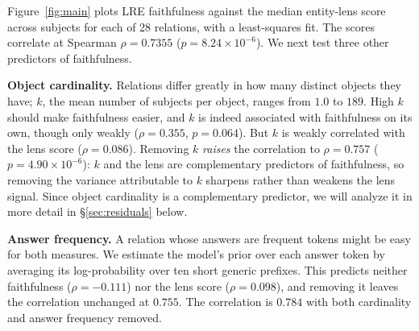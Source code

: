 \documentclass{article}
\def\headlinenumber{0.7355}
\begin{document}
Figure~\ref{fig:main} plots LRE faithfulness against the median entity-lens
score across subjects for each of 28 relations, with a least-squares fit.
The scores correlate at Spearman $\rho = \headlinenumber$
($p = 8.24\!\times\!10^{-6}$).
We next test three other predictors of faithfulness.




\textbf{Object cardinality.} Relations
differ greatly in how many distinct objects they have; $k$, the mean number
of subjects per object, ranges from $1.0$ to $189$. High $k$ should make
faithfulness easier, and $k$ is indeed associated with faithfulness on
its own, though only weakly
($\rho = 0.355$, $p = 0.064$). But $k$ is weakly correlated with the
lens score ($\rho = 0.086$). Removing $k$  \emph{raises} the
correlation to $\rho = 0.757$ ($p = 4.90\!\times\!10^{-6}$): $k$ and the lens are
complementary predictors of faithfulness, so removing the variance
attributable to $k$ sharpens rather than weakens the lens
signal. Since object cardinality is a complementary
predictor, we will analyze it in more detail in \S\ref{sec:residuals} below.

\textbf{Answer frequency.} A relation whose answers are frequent
tokens might be easy for both measures. We estimate the model's prior over
each answer token by averaging its log-probability over ten short
generic prefixes.
This predicts neither faithfulness ($\rho = -0.111$) nor the lens
score ($\rho = 0.098$), and removing it leaves the correlation
unchanged at $0.755$. The correlation is $0.784$ with both cardinality
and answer frequency removed.
\end{document}
